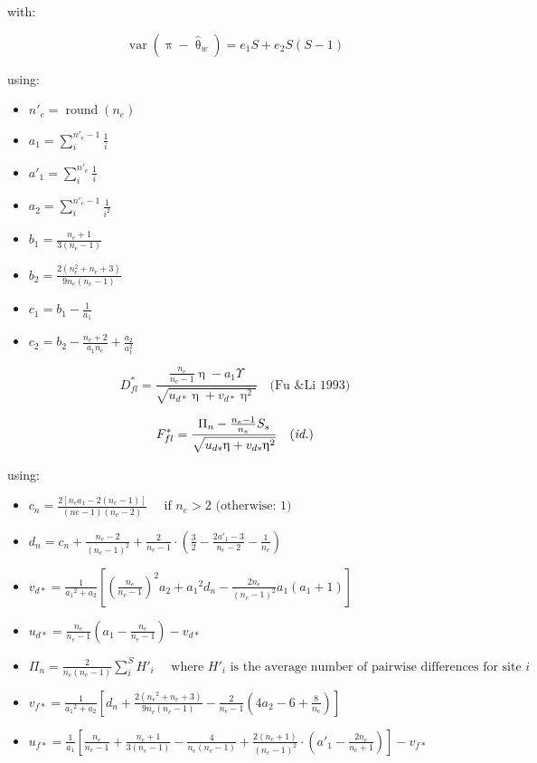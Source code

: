 \documentclass{scrartcl}
\begin{document}
with:

\begin{displaymath}
    \operatorname{var}(\uppi - \hat{\uptheta}_w) = e_1 S + e_2 S(S-1)
\end{displaymath}

using:

\begin{itemize}
    \item[] $n'_e = \operatorname{round}(n_e)$
    \item[] $a_1 = \sum_i^{n'_e - 1} \frac{1}{i}$
    \item[] $a'_1 = \sum_i^{n'_e} \frac{1}{i}$
    \item[] $a_2 = \sum_i^{n'_e-1} \frac{1}{i^2}$
    \item[] $b_1 = \frac{n_e+1 }{ 3(n_e-1)}$
    \item[] $b_2 = \frac{2(n_e^2 + n_e+3)}{9n_e(n_e-1)}$
    \item[] $c_1 = b_1 - \frac{1}{a_1}$
    \item[] $c_2 = b_2 - \frac{n_e+2}{a_1 n_e} + \frac{a_2}{a_1^2}$
\end{itemize}

\begin{displaymath}
    D^*_{fl} = \frac{ \frac{n_e}{n_e-1} \upeta - a_1 \Upsilon}  {\sqrt{u_{d*} \upeta + v_{d*} \upeta^2}} \quad \mbox{(Fu \& Li 1993)}
\end{displaymath}

\begin{displaymath}
    F^*_{fl} = \frac{\Pi_n - \frac{n_e-1}{n_e} S_s}  {\sqrt{u_{d*} \upeta + v_{d*} \upeta^2}} \quad \mbox{(\textit{id.})}
\end{displaymath}

using:

\begin{itemize}
    \item[] $c_n = \frac{2[n_e a_1 - 2(n_e -1)]}{(ne-1)(n_e-2)} \quad \mbox{ if } n_e > 2 \mbox{ (otherwise: 1)}$ 
    \item[] $d_n = c_n + \frac{n_e-2}{(n_e-1)^2} + \frac{2}{n_e-1} \cdot \left( \frac{3}{2} - \frac{2a'_1-3}{n_e-2} - \frac{1}{n_e} \right)$
    \item[] $v_{d*} = \frac{1}{{a_1}^2+a_2} \left[ \left( \frac{n_e}{n_e-1} \right)^2 a_2 + {a_1}^2 d_n - \frac{2n_e}{(n_e-1)^2} a_1(a_1+1)   \right]$
    \item[] $u_{d*} = \frac{n_e}{n_e-1} (a_1 - \frac{n_e}{n_e-1}) - v_{d*}$
    \item[] $\Pi_n = \frac{2}{n_e(n_e-1)} \sum_i^S H'_i \quad \mbox{ where } H'_i \mbox{ is the average number of pairwise differences for site } i$
    \item[] $v_{f*} = \frac{1}{{a_1}^2+a_2} \left[ d_n + \frac{2({n_e}^2+n_e+3)}{9n_e(n_e-1)} - \frac{2}{n_e-1} (4a_2 - 6 + \frac{8}{n_e}) \right]$
    \item[] $u_{f*} = \frac{1}{a_1} \left[ \frac{n_e}{n_e-1}  + \frac{n_e+1}{3(n_e-1)} - \frac{4}{n_e(n_e-1)}  + \frac{2(n_e+1)}{(n_e-1)^2} \cdot (a'_1 - \frac{2n_e}{n_e+1}) \right] - v_{f*}$
\end{itemize}
\end{document}
